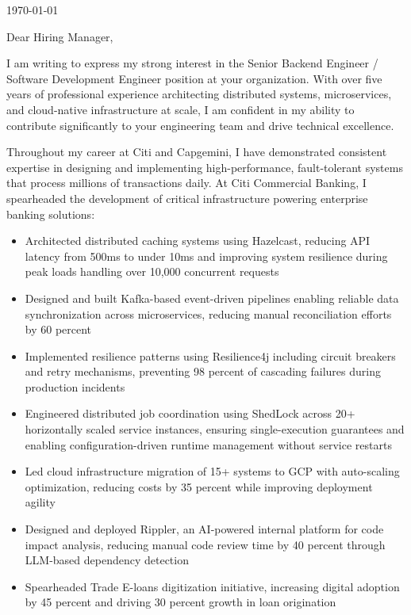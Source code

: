 \documentclass[]{hanisntsolo-resume}
\begin{document}
\vspace*{-0.5in}

\begin{flushright}
\today
\end{flushright}

\vspace{0.3in}

Dear Hiring Manager,

\vspace{0.2in}

I am writing to express my strong interest in the Senior Backend Engineer / Software Development Engineer position at your organization. With over five years of professional experience architecting distributed systems, microservices, and cloud-native infrastructure at scale, I am confident in my ability to contribute significantly to your engineering team and drive technical excellence.

\vspace{0.15in}

Throughout my career at Citi and Capgemini, I have demonstrated consistent expertise in designing and implementing high-performance, fault-tolerant systems that process millions of transactions daily. At Citi Commercial Banking, I spearheaded the development of critical infrastructure powering enterprise banking solutions:

\vspace{0.1in}

\begin{itemize}
\setlength\itemsep{0.05in}
\item Architected distributed caching systems using Hazelcast, reducing API latency from 500ms to under 10ms and improving system resilience during peak loads handling over 10,000 concurrent requests
\item Designed and built Kafka-based event-driven pipelines enabling reliable data synchronization across microservices, reducing manual reconciliation efforts by 60 percent
\item Implemented resilience patterns using Resilience4j including circuit breakers and retry mechanisms, preventing 98 percent of cascading failures during production incidents
\item Engineered distributed job coordination using ShedLock across 20+ horizontally scaled service instances, ensuring single-execution guarantees and enabling configuration-driven runtime management without service restarts
\item Led cloud infrastructure migration of 15+ systems to GCP with auto-scaling optimization, reducing costs by 35 percent while improving deployment agility
\item Designed and deployed Rippler, an AI-powered internal platform for code impact analysis, reducing manual code review time by 40 percent through LLM-based dependency detection
\item Spearheaded Trade E-loans digitization initiative, increasing digital adoption by 45 percent and driving 30 percent growth in loan origination
\end{itemize}
\end{document}

